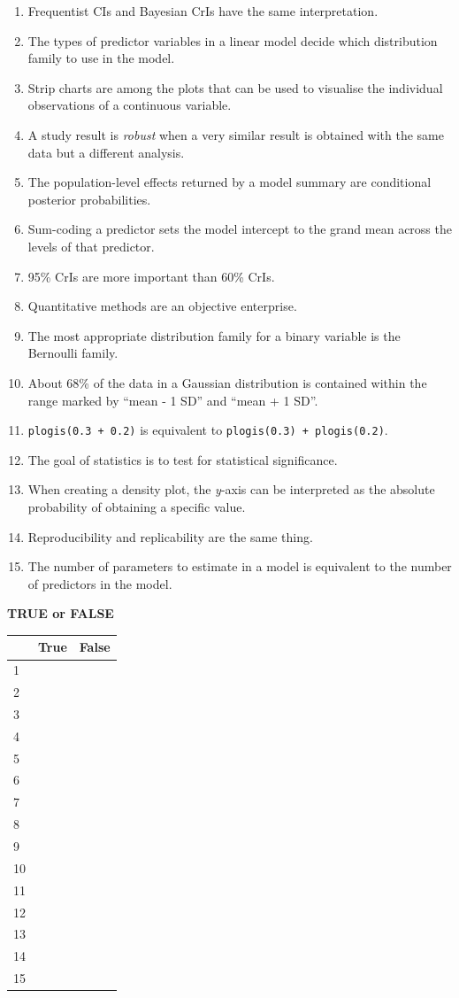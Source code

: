 \documentclass[
]{article}
\providecommand{\tightlist}{%
  \setlength{\itemsep}{0pt}\setlength{\parskip}{0pt}}
\begin{document}
\begin{enumerate}
\def\labelenumi{\arabic{enumi}.}
\tightlist
\item
  Frequentist CIs and Bayesian CrIs have the same interpretation.
\item
  The types of predictor variables in a linear model decide which
  distribution family to use in the model.
\item
  Strip charts are among the plots that can be used to visualise the
  individual observations of a continuous variable.
\item
  A study result is \emph{robust} when a very similar result is obtained
  with the same data but a different analysis.
\item
  The population-level effects returned by a model summary are
  conditional posterior probabilities.
\item
  Sum-coding a predictor sets the model intercept to the grand mean
  across the levels of that predictor.
\item
  95\% CrIs are more important than 60\% CrIs.
\item
  Quantitative methods are an objective enterprise.
\item
  The most appropriate distribution family for a binary variable is the
  Bernoulli family.
\item
  About 68\% of the data in a Gaussian distribution is contained within
  the range marked by ``mean - 1 SD'' and ``mean + 1 SD''.
\item
  \texttt{plogis(0.3\ +\ 0.2)} is equivalent to
  \texttt{plogis(0.3)\ +\ plogis(0.2)}.
\item
  The goal of statistics is to test for statistical significance.
\item
  When creating a density plot, the \emph{y}-axis can be interpreted as
  the absolute probability of obtaining a specific value.
\item
  Reproducibility and replicability are the same thing.
\item
  The number of parameters to estimate in a model is equivalent to the
  number of predictors in the model.
\end{enumerate}

\textbf{TRUE or FALSE}

\begin{longtable}[]{@{}lll@{}}
\toprule()
& True & False \\
\midrule()
\endhead
1 & & \\
2 & & \\
3 & & \\
4 & & \\
5 & & \\
6 & & \\
7 & & \\
8 & & \\
9 & & \\
10 & & \\
11 & & \\
12 & & \\
13 & & \\
14 & & \\
15 & & \\
\bottomrule()
\end{longtable}
\end{document}
